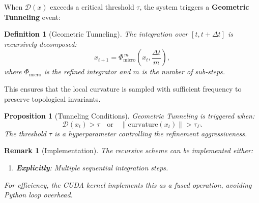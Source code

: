 \documentclass[12pt,letterpaper,twoside]{article}
\newtheorem{definition}{Definition}[section]
\newtheorem{remarque}{Remark}[section]
\newtheorem{prop}{Proposition}[section]
\begin{document}
When $\mathcal{D}(x)$ exceeds a critical threshold $\tau$, the system triggers a \textbf{Geometric Tunneling} event:

\begin{definition}[Geometric Tunneling]
The integration over $[t, t + \Delta t]$ is recursively decomposed:
\[
x_{t+1} = \Phi_{\text{micro}}^{\, m}\left(x_t, \frac{\Delta t}{m}\right),
\]
where $\Phi_{\text{micro}}$ is the refined integrator and $m$ is the number of sub-steps.
\end{definition}

This ensures that the local curvature is sampled with sufficient frequency to preserve topological invariants.

\begin{prop}[Tunneling Conditions]
Geometric Tunneling is triggered when:
\[
\mathcal{D}(x_t) > \tau \quad \text{or} \quad \|\text{curvature}(x_t)\| > \tau_\Gamma.
\]
The threshold $\tau$ is a hyperparameter controlling the refinement aggressiveness.
\end{prop}

\begin{remarque}[Implementation]
The recursive scheme can be implemented either:
\begin{enumerate}
\item \textbf{Explicitly}: Multiple sequential integration steps.
\end{enumerate}
For efficiency, the CUDA kernel implements this as a fused operation, avoiding Python loop overhead.
\end{remarque}
\end{document}
